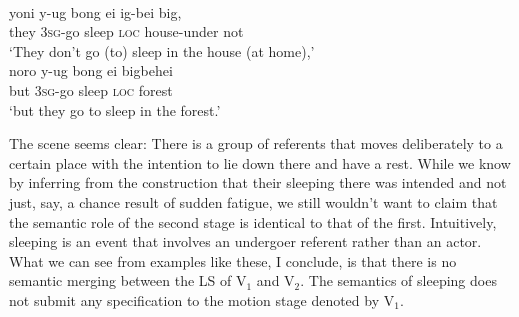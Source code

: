 \ea \label{Hatam6465}
\\
\ea
\gll yoni y-ug bong ei ig-bei big, \\
they \textsc{3}\textsc{sg}-go sleep \textsc{loc} house-under not \\
\glft `They don't go (to) sleep in the house (at home),' \\ 
\ex
\gll noro y-ug bong ei bigbehei \\ 
but \textsc{3}\textsc{sg}-go sleep \textsc{loc} forest \\
\glft `but they go to sleep in the forest.' \\ 
\z
\z

The scene seems clear: There is a group of referents that moves deliberately to a certain place with the intention to lie down there and have a rest. While we know by inferring from the construction that their sleeping there was intended and not just, say, a chance result of sudden fatigue, we still wouldn't want to claim that the semantic role of the second stage is identical to that of the first. Intuitively, sleeping is an event that involves an undergoer referent rather than an actor. What we can see from examples like these, I conclude, is that there is no semantic merging between the LS of V$_1$ and V$_2$. The semantics of sleeping does not submit any specification to the motion stage denoted by V$_1$.

